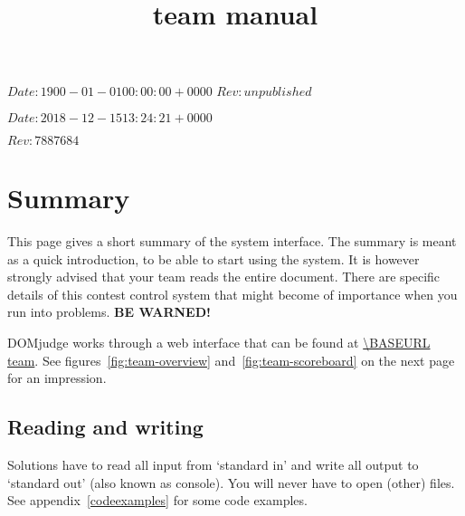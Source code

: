 

\usepackage[english]{babel}

\SVN $Date: 1900-01-01 00:00:00 +0000 $
\SVN $Rev: unpublished $
% 

\SVN $Date: 2018-12-15 13:24:21 +0000 $
% 

\SVN $Rev: 7887684 $

\title{\DOMjudge team manual}




\titlestuff{\DOMJUDGEVERSION}{\SVNRev}{\SVNDate}{\today}

\section*{Summary}

This page gives a short summary of the system interface. The summary
is meant as a quick introduction, to be able to start using the system.
It is however strongly advised that your team reads the entire document.
There are specific details of this contest control system that might become of
importance when you run into problems. \textbf{BE WARNED!}

DOMjudge works through a web interface that can be found at
\url{\BASEURL team}. See figures~\ref{fig:team-overview}
and~\ref{fig:team-scoreboard} on the next page for an impression.

\subsection*{Reading and writing}

Solutions have to read all input from `standard in' and write all
output to `standard out' (also known as console). You will never have
to open (other) files. See appendix~\ref{codeexamples} for some code
examples.

